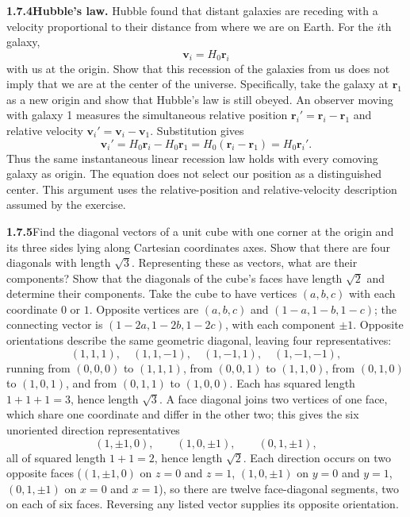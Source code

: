 \par\bigskip
\noindent\textbf{1.7.4}\quad \textbf{Hubble's law.} Hubble found that distant
galaxies are receding with a velocity proportional to their distance from
where we are on Earth. For the $i$th galaxy,
\[
\mathbf{v}_{i}=H_{0}\mathbf{r}_{i}
\]
with us at the origin. Show that this recession of the galaxies from us does
not imply that we are at the center of the universe. Specifically, take the
galaxy at $\mathbf{r}_{1}$ as a new origin and show that Hubble's law is still
obeyed.
\solution
An observer moving with galaxy 1 measures the simultaneous relative
position $\mathbf r_i'=\mathbf r_i-\mathbf r_1$ and relative velocity
$\mathbf v_i'=\mathbf v_i-\mathbf v_1$. Substitution gives
\[
 \mathbf v_i'=H_0\mathbf r_i-H_0\mathbf r_1
             =H_0(\mathbf r_i-\mathbf r_1)=H_0\mathbf r_i'.
\]
Thus the same instantaneous linear recession law holds with every
comoving galaxy as origin. The equation does not select our position
as a distinguished center. This argument uses the relative-position
and relative-velocity description assumed by the exercise.


\par\bigskip
\noindent\textbf{1.7.5}\quad Find the diagonal vectors of a unit cube with one
corner at the origin and its three sides lying along Cartesian coordinates
axes. Show that there are four diagonals with length $\sqrt{3}$. Representing
these as vectors, what are their components? Show that the diagonals of the
cube's faces have length $\sqrt{2}$ and determine their components.
\solution
Take the cube to have vertices $(a,b,c)$ with each coordinate $0$ or
$1$. Opposite vertices are $(a,b,c)$ and $(1-a,1-b,1-c)$; the
connecting vector is $(1-2a,1-2b,1-2c)$, with each component $\pm1$.
Opposite orientations describe the same geometric diagonal, leaving
four representatives:
\[
 (1,1,1),\quad(1,1,-1),\quad(1,-1,1),\quad(1,-1,-1),
\]
running from $(0,0,0)$ to $(1,1,1)$, from $(0,0,1)$ to $(1,1,0)$, from
$(0,1,0)$ to $(1,0,1)$, and from $(0,1,1)$ to $(1,0,0)$.
Each has squared length $1+1+1=3$, hence length $\sqrt3$.
A face diagonal joins two vertices of one face, which share one coordinate
and differ in the other two; this gives the six
unoriented direction representatives
\[
 (1,\pm1,0),\qquad(1,0,\pm1),\qquad(0,1,\pm1),
\]
all of squared length $1+1=2$, hence length $\sqrt2$. Each direction
occurs on two opposite faces ($(1,\pm1,0)$ on $z=0$ and $z=1$,
$(1,0,\pm1)$ on $y=0$ and $y=1$, $(0,1,\pm1)$ on $x=0$ and $x=1$),
so there are twelve face-diagonal segments, two on each of six faces.
Reversing any listed vector supplies its opposite orientation.



